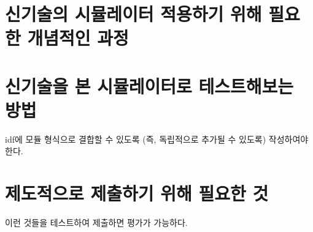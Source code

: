 \section{신기술의 시뮬레이터 적용하기 위해 필요한 개념적인 과정}


\section{신기술을 본 시뮬레이터로 테스트해보는 방법}

idf에 모듈 형식으로 결합할 수 있도록 (즉, 독립적으로 추가될 수 있도록) 작성하여야 한다. 


\section{제도적으로 제출하기 위해 필요한 것}

이런 것들을 테스트하여 제출하면 평가가 가능하다.